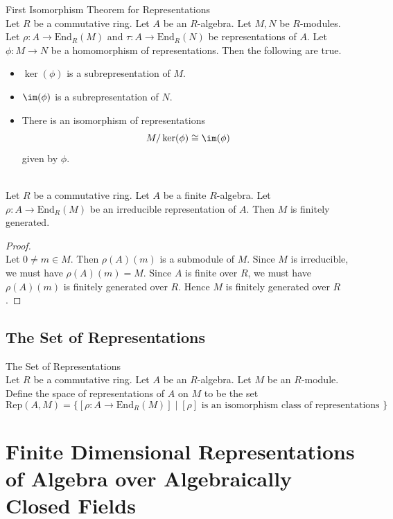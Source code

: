 \documentclass[a4paper]{article}
\begin{document}
\begin{thm}{First Isomorphism Theorem for Representations}{}\\
Let $R$ be a commutative ring. Let $A$ be an $R$-algebra. Let $M,N$ be $R$-modules. Let $\rho:A\to\text{End}_R(M)$ and $\tau:A\to\text{End}_R(N)$ be representations of $A$. Let $\phi:M\to N$ be a homomorphism of representations. Then the following are true. 
\begin{itemize}
\item $\ker(\phi)$ is a subrepresentation of $M$. 
\item $\im(\phi)$ is a subrepresentation of $N$. 
\item There is an isomorphism of representations $$M/\ker(\phi)\cong\im(\phi)$$ given by $\phi$. 
\end{itemize}
\end{thm}

\begin{prp}{}{}\\
Let $R$ be a commutative ring. Let $A$ be a finite $R$-algebra. Let $\rho:A\to\text{End}_R(M)$ be an irreducible representation of $A$. Then $M$ is finitely generated. 
\begin{proof}\\
Let $0\neq m\in M$. Then $\rho(A)(m)$ is a submodule of $M$. Since $M$ is irreducible, we must have $\rho(A)(m)=M$. Since $A$ is finite over $R$, we must have $\rho(A)(m)$ is finitely generated over $R$. Hence $M$ is finitely generated over $R$. 
\end{proof}
\end{prp}

\subsection{The Set of Representations}
\begin{defn}{The Set of Representations}{}\\
Let $R$ be a commutative ring. Let $A$ be an $R$-algebra. Let $M$ be an $R$-module. Define the space of representations of $A$ on $M$ to be the set $$\text{Rep}(A,M)=\{[\rho:A\to\text{End}_R(M)]\;|\;[\rho]\text{ is an isomorphism class of representations }\}$$
\end{defn}

\pagebreak
\section{Finite Dimensional Representations of Algebra over Algebraically Closed Fields}
\end{document}
